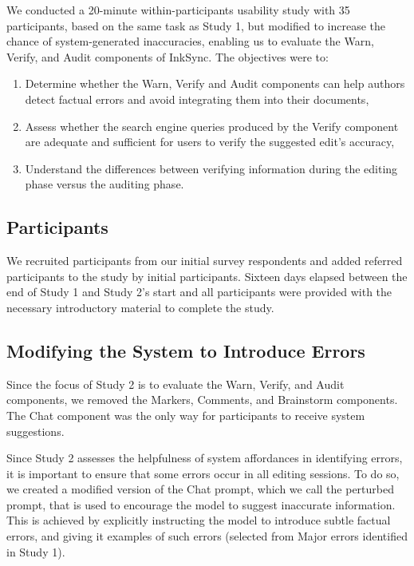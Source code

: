 \documentclass[manuscript]{acmart}
\begin{document}
We conducted a 20-minute within-participants usability study with 35 participants, based on the same task as Study 1, but modified to increase the chance of system-generated inaccuracies, enabling us to evaluate the Warn, Verify, and Audit components of InkSync. The objectives were to:
\begin{enumerate}
    \item Determine whether the Warn, Verify and Audit components can help authors detect factual errors and avoid integrating them into their documents,
    \item Assess whether the search engine queries produced by the Verify component are adequate and sufficient for users to verify the suggested edit's accuracy,
    \item Understand the differences between verifying information during the editing phase versus the auditing phase.
\end{enumerate}

\subsection{Participants} \label{sec:study2_participants}

We recruited participants from our initial survey respondents and added referred participants to the study by initial participants. Sixteen days elapsed between the end of Study 1 and Study 2's start and all participants were provided with the necessary introductory material to complete the study.

\subsection{Modifying the System to Introduce Errors} \label{sec:study2_modifications}

Since the focus of Study 2 is to evaluate the Warn, Verify, and Audit components, we removed the Markers, Comments, and Brainstorm components. The Chat component was the only way for participants to receive system suggestions.

Since Study 2 assesses the helpfulness of system affordances in identifying errors, it is important to ensure that some errors occur in all editing sessions.
To do so, we created a modified version of the Chat prompt, which we call the perturbed prompt, that is used to encourage the model to suggest inaccurate information. This is achieved by explicitly instructing the model to introduce subtle factual errors, and giving it examples of such errors (selected from Major errors identified in Study 1).
\end{document}
